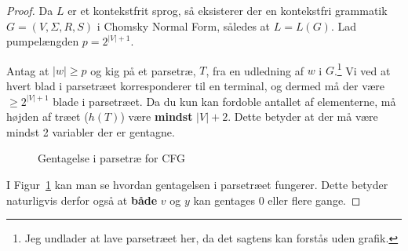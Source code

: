 \begin{proof}
  Da $L$ er et kontekstfrit sprog, så eksisterer der en kontekstfri grammatik $G = (V, \Sigma, R, S)$ i Chomsky Normal Form, således at $L = L(G)$. Lad pumpelængden $p = 2^{|V| + 1}$.

  Antag at $|w| \ge p$ og kig på et parsetræ, $T$, fra en udledning af $w$ i  $G$.\footnote{Jeg undlader at lave parsetræet her, da det sagtens kan forstås uden grafik.} Vi ved at hvert blad i parsetræet korresponderer til en terminal, og dermed må der være $\ge 2^{|V| +1}$ blade i parsetræet. Da du kun kan fordoble antallet af elementerne, må højden af træet ($h(T)$) være \textbf{mindst} $|V| + 2$. Dette betyder at der må være mindst 2 variabler der er gentagne.

\begin{figure}[ht]
  \centering
{}
  \caption{\label{fig:pumpelemmacfg} Gentagelse i parsetræ for CFG}
\end{figure}

I Figur~\ref{fig:pumpelemmacfg} kan man se hvordan gentagelsen i parsetræet fungerer. Dette betyder naturligvis derfor også at \textbf{både} $v$ og $y$ kan gentages 0 eller flere gange.
\end{proof}



